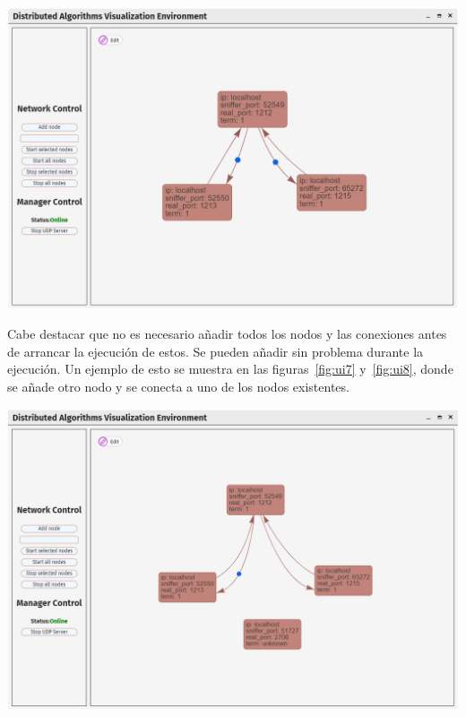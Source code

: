 {
\centering
\includegraphics[width=0.9\linewidth]{imagenes/ui6}
\label{fig:ui6}
}

Cabe destacar que no es necesario añadir todos los nodos y las conexiones antes de arrancar la ejecución de estos. Se pueden añadir sin problema durante la ejecución. Un ejemplo de esto se muestra en las figuras~\ref{fig:ui7} y~\ref{fig:ui8}, donde se añade otro nodo y se conecta a uno de los nodos existentes.

{
\centering
\includegraphics[width=0.9\linewidth]{imagenes/ui7}
\label{fig:ui7}
}

